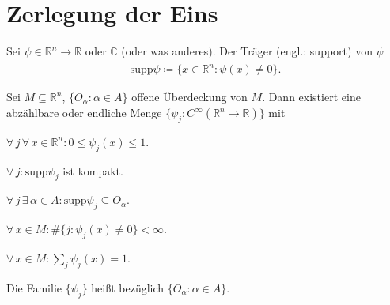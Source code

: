 \documentclass[a4paper,10pt]{scrbook}
\begin{document}
%
%

\section{Zerlegung der Eins}
\addtocounter{thmn}{1}
\setcounter{theorem}{0}


\begin{theorem}[Definition] \label{thm:10.1}
  Sei $\psi \in \mathbb{R}^n \to \mathbb{R}$ oder $\mathbb{C}$ (oder was anderes). Der Träger (engl.: support) von $\psi$
  \begin{align*}
    \mathrm{supp} \psi \coloneq \overline{\{ x \in \mathbb{R}^n : \psi(x) \neq 0 \}}.
  \end{align*}
\end{theorem}

\begin{theorem}[Satz] \label{thm:10.2}
  Sei $M \subseteq \mathbb{R}^n$, $\{ O_\alpha : \alpha \in A \}$ offene Überdeckung von $M$. Dann existiert eine abzählbare oder endliche Menge $\{ \psi_j : C^\infty(\mathbb{R}^n \to \mathbb{R}) \}$ mit
  \begin{enum-roman}
    \item \label{itm:10.2 i} $\forall \, j \, \forall \, x \in \mathbb{R}^n : 0 \leq \psi_j(x) \leq 1$.

    \item \label{itm:10.2 ii} $\forall \, j : \mathrm{supp} \psi_j$ ist kompakt.

    \item \label{itm:10.2 iii} $\forall \, j \, \exists \, \alpha \in A : \mathrm{supp} \psi_j \subseteq O_\alpha$.

    \item \label{itm:10.2 iv} $\forall \, x \in M : \# \{ j : \psi_j(x) \neq 0 \} < \infty$.

    \item \label{itm:10.2 v} $\forall \, x \in M : \sum\limits_{j} \psi_j(x) = 1$.
  \end{enum-roman}
  Die Familie $\{ \psi_j \}$ heißt  bezüglich $\{ O_\alpha : \alpha \in A \}$.
\end{theorem}
\end{document}
